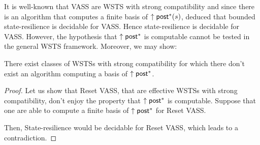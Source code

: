 \iffalse
\begin{proof}
By Proposition~\ref{post*}, a basis of $\uparrow \post^*(s)$ is computable for every state $s$ iff the downward-reachability problem is decidable.
Let us now show that the downward-reachability problem is decidable for Petri nets.
Let us consider a downward closed set $D$ in a Petri net.
Let us consider $B$ a basis of the upward-closed set $S \setminus D$.

$D$ is  defined by ... states where your number of counter is bounded by a constant (deduce this from ... having to be smaller than elements of the basis $B$), and others where it is unbounded. You have $m$ counters where it is bounded by $n$
then you have $m \times n$ possibilities for the values in these counters
you have unlimited possibilities for the values of the other counters,
but that is where the submarking problem comes in handy,
i.e. you ask the submarking problem for all of the $m \times n$ possibilities.

So downward-set reachability is decidable for PN.
\end{proof}
\fi

It is well-known that 
VASS are WSTS with strong compatibility and since there is an algorithm that computes a finite basis of  $\uparrow \post^*(s)$, \cite{DBLP:conf/gg/Ozkan22} deduced that bounded state-resilience is decidable for VASS.
Hence state-resilience is decidable for %
VASS.
However, the hypothesis that $\uparrow \textsf{post}^*$ is computable cannot be tested in the general WSTS framework. Moreover, we may show:

\begin{proposition}
There exist classes of WSTSs with strong 
 compatibility for which there don't exist an algorithm computing a basis of $\uparrow \textsf{post}^*$.
\end{proposition}


\begin{proof}
Let us show that Reset VASS, that are effective WSTSs with strong compatibility, don't enjoy the property that $\uparrow \textsf{post}^*$ is computable.
Suppose that one are able to compute a finite basis of $\uparrow \textsf{post}^*$ for Reset VASS. 
\iffalse
Then, one would be able to decide whether an element $m \in \min(\uparrow \post^*)$ is reachable.
by examining if there is %
$0$ in the basis%
. But reachability of $0$  %
is undecidable for Reset VASS. 
\fi
Then, {\sc State-resilience} would be decidable for Reset VASS, which leads to a contradiction.
\end{proof}

